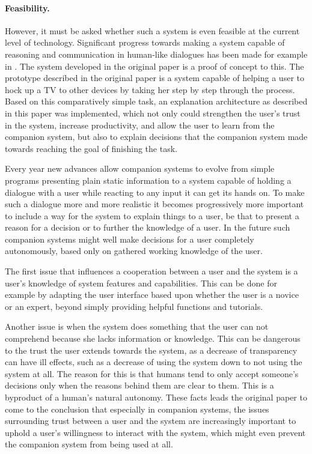 \documentclass[a4paper]{article}
\begin{document}
\paragraph{Feasibility.} However, it must be asked whether such a system is even feasible at the current level of technology. Significant progress towards making a system capable of reasoning and communication in human-like dialogues has been made for example in \cite{allen2001toward}. The system developed in the original paper is a proof of concept to this. The prototype described in the original paper is a system capable of helping a user to hock up a TV to other devices by taking her step by step through the process. Based on this comparatively simple task, an explanation architecture as described in this paper was implemented, which not only could strengthen the user's trust in the system, increase productivity, and allow the user to learn from the companion system, but also to explain decisions that the companion system made towards reaching the goal of finishing the task.

Every year new advances allow companion systems to evolve from simple programs presenting plain static information to a system capable of holding a dialogue with a user while reacting to any input it can get its hands on. To make such a dialogue more and more realistic it becomes progressively more important to include a way for the system to explain things to a user, be that to present a reason for a decision or to further the knowledge of a user. In the future such companion systems might well make decisions for a user completely autonomously, based only on gathered working knowledge of the user.\label{adaptive_companion}

The first issue that influences a cooperation between a user and the system is a user's knowledge of system features and capabilities. This can be done for example by adapting the user interface based upon whether the user is a novice or an expert, beyond simply providing helpful functions and tutorials.

Another issue is when the system does something that the user can not comprehend because she lacks information or knowledge. This can be dangerous to the trust the user extends towards the system, as a decrease of transparency can have ill effects, such as a decrease of using the system down to not using the system at all. The reason for this is that humans tend to only accept someone's decisions only when the reasons behind them are clear to them. This is a byproduct of a human's natural autonomy. These facts leads the original paper to come to the conclusion that especially in companion systems, the issues surrounding trust between a user and the system are increasingly important to uphold a user's willingness to interact with the system, which might even prevent the companion system from being used at all.
\end{document}
